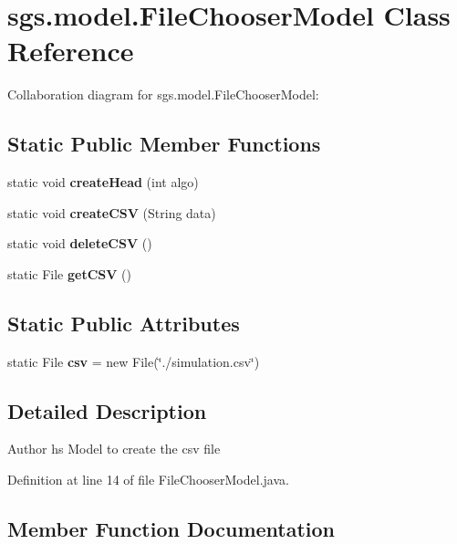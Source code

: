 \section{sgs.\-model.\-File\-Chooser\-Model Class Reference}
\label{classsgs_1_1model_1_1_file_chooser_model}


Collaboration diagram for sgs.\-model.\-File\-Chooser\-Model\-:
\subsection*{Static Public Member Functions}
\begin{DoxyCompactItemize}
\item 
static void {\bf create\-Head} (int algo)
\item 
static void {\bf create\-C\-S\-V} (String data)
\item 
static void {\bf delete\-C\-S\-V} ()
\item 
static File {\bf get\-C\-S\-V} ()
\end{DoxyCompactItemize}
\subsection*{Static Public Attributes}
\begin{DoxyCompactItemize}
\item 
static File {\bf csv} = new File(\char`\"{}./simulation.\-csv\char`\"{})
\end{DoxyCompactItemize}


\subsection{Detailed Description}
\begin{DoxyAuthor}{Author}
hs Model to create the csv file 
\end{DoxyAuthor}


Definition at line 14 of file File\-Chooser\-Model.\-java.



\subsection{Member Function Documentation}
